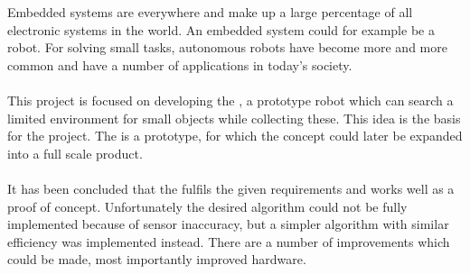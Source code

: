 Embedded systems are everywhere and make up a large percentage of all electronic systems in the world. An embedded system could for example be a robot. For solving small tasks, autonomous robots have become more and more common and have a number of applications in today's society.
\\\\
This project is focused on developing the \projname{}, a prototype robot which can search a limited environment for small objects while collecting these. This idea is the basis for the project. The \projname{} is a prototype, for which the concept could later be expanded into a full scale product.
\\\\
It has been concluded that the \projname{} fulfils the given requirements and works well as a proof of concept. Unfortunately the desired algorithm could not be fully implemented because of sensor inaccuracy, but a simpler algorithm with similar efficiency was implemented instead. There are a number of improvements which could be made, most importantly improved hardware.
